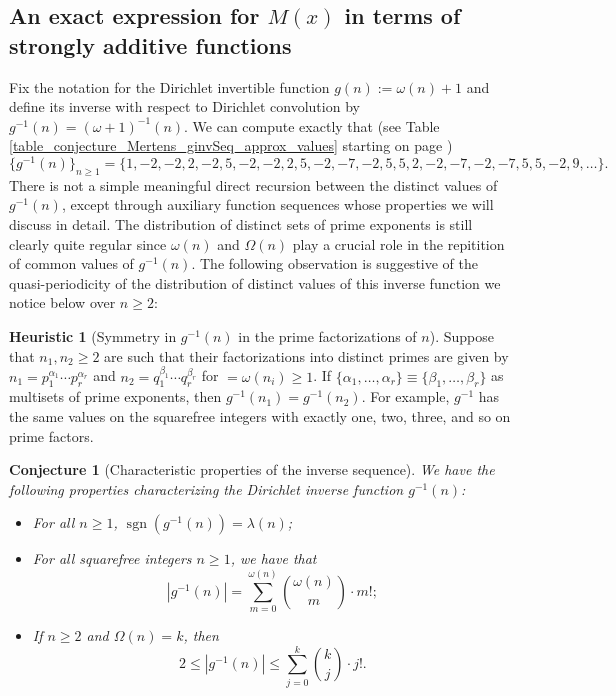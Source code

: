 \documentclass[11pt,reqno,a4letter]{article}
\numberwithin{figure}{section}
\numberwithin{table}{section}
\theoremstyle{plain}
\newtheorem{conjecture}[theorem]{Conjecture}
\numberwithin{theorem}{section}
\theoremstyle{definition}
\newtheorem{heuristic}[theorem]{Heuristic}
\newcommand{\NBRef}[1]{}
\begin{document}
\subsection{An exact expression for $M(x)$ in terms of strongly additive functions} 
\label{example_InvertingARecRelForMx_Intro}

Fix the notation for the Dirichlet invertible function $g(n) := \omega(n) + 1$ and define its 
inverse with respect to Dirichlet convolution by $g^{-1}(n) = (\omega+1)^{-1}(n)$. 
We can compute exactly that 
(see Table \ref{table_conjecture_Mertens_ginvSeq_approx_values} starting on page 
\pageref{table_conjecture_Mertens_ginvSeq_approx_values}) 
\[
\{g^{-1}(n)\}_{n \geq 1} = \{1, -2, -2, 2, -2, 5, -2, -2, 2, 5, -2, -7, -2, 5, 5, 2, -2, -7, -2, 
     -7, 5, 5, -2, 9, \ldots \}. 
\] 
There is not a simple meaningful 
direct recursion between the distinct values of $g^{-1}(n)$, except 
through auxiliary function sequences whose properties we will discuss in detail. 
The distribution of distinct sets of prime exponents is still clearly quite regular since 
$\omega(n)$ and $\Omega(n)$ play a crucial role in the repitition of common values of 
$g^{-1}(n)$. 
The following observation is suggestive of the quasi-periodicity of the distribution of 
distinct values of this inverse function we notice below over $n \geq 2$: 

\begin{heuristic}[Symmetry in $g^{-1}(n)$ in the prime factorizations of $n$] 
\label{heuristic_SymmetryIngInvFuncs} 
Suppose that $n_1, n_2 \geq 2$ are such that their factorizations into distinct primes are 
given by $n_1 = p_1^{\alpha_1} \cdots p_r^{\alpha_r}$ and $n_2 = q_1^{\beta_1} \cdots q_r^{\beta_r}$ 
for $ = \omega(n_i) \geq 1$. 
If $\{\alpha_1, \ldots, \alpha_r\} \equiv \{\beta_1, \ldots, \beta_r\}$ as multisets of prime exponents, 
then $g^{-1}(n_1) = g^{-1}(n_2)$. For example, $g^{-1}$ has the same values on the squarefree integers 
with exactly one, two, three, and so on prime factors.  
\end{heuristic} 

\NBRef{A01-2020-04-26}
\begin{conjecture}[Characteristic properties of the inverse sequence] 
\label{lemma_gInv_MxExample} 
We have the following properties characterizing the 
Dirichlet inverse function $g^{-1}(n)$: 
\begin{itemize} 

\item[\textbf{(A)}] For all $n \geq 1$, $\operatorname{sgn}(g^{-1}(n)) = \lambda(n)$; 
\item[\textbf{(B)}] For all squarefree integers $n \geq 1$, we have that 
     \[
     |g^{-1}(n)| = \sum_{m=0}^{\omega(n)} \binom{\omega(n)}{m} \cdot m!; 
     \]
\item[\textbf{(C)}] If $n \geq 2$ and $\Omega(n) = k$, then 
     \[
     2 \leq |g^{-1}(n)| \leq \sum_{j=0}^{k} \binom{k}{j} \cdot j!. 
     \]
\end{itemize} 
\end{conjecture} 
\end{document}
